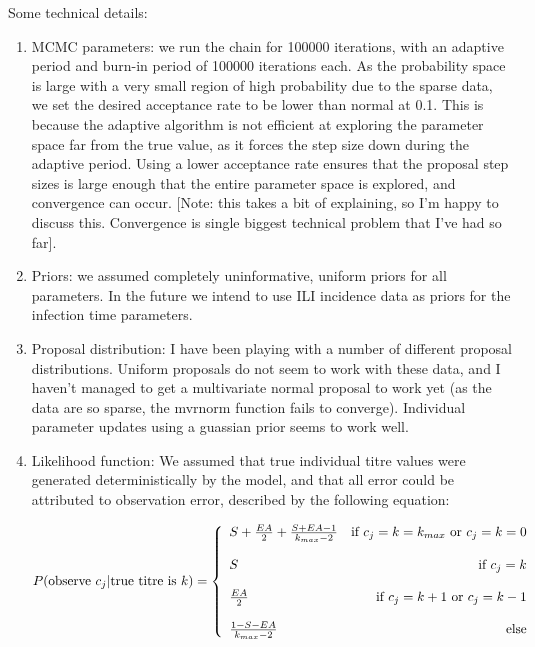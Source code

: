 \documentclass[a4paper,11pt,twoside]{article}
\begin{document}
Some technical details:
\begin{enumerate}
\item MCMC parameters: we run the chain for 100000 iterations, with an adaptive period and burn-in period of 100000 iterations each. As the probability space is large with a very small region of high probability due to the sparse data, we set the desired acceptance rate to be lower than normal at 0.1. This is because the adaptive algorithm is not efficient at exploring the parameter space far from the true value, as it forces the step size down during the adaptive period. Using a lower acceptance rate ensures that the proposal step sizes is large enough that the entire parameter space is explored, and convergence can occur. [Note: this takes a bit of explaining, so I'm happy to discuss this. Convergence is single biggest technical problem that I've had so far].
\item Priors: we assumed completely uninformative, uniform priors for all parameters. In the future we intend to use ILI incidence data as priors for the infection time parameters.
\item Proposal distribution: I have been playing with a number of different proposal distributions. Uniform proposals do not seem to work with these data, and I haven't managed to get a multivariate normal proposal to work yet (as the data are so sparse, the mvrnorm function fails to converge). Individual parameter updates using a guassian prior seems to work well.
\item Likelihood function: We assumed that true individual titre values were generated deterministically by the model, and that all error could be attributed to observation error, described by the following equation:

\begin{equation}
P(\textnormal{observe } c_j | \textnormal{true titre is } k) = \left\{
\begin{array}{lr}
S + \frac{EA}{2} + \frac{S+EA-1}{k_{max}-2} & \textnormal{if } c_j = k = k_{max} \textnormal{ or } c_j = k = 0\\\\
S & \textnormal{if } c_j = k\\\\
\frac{EA}{2} & \textnormal{if } c_j = k+1 \textnormal{ or } c_j = k-1\\\\
\frac{1-S-EA}{k_{max}-2} & \textnormal{else}
\end{array}
\right. 
\end{equation}


\end{enumerate}
\end{document}
